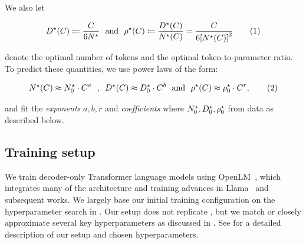 \documentclass{article}
\newcommand{\neurips}[1]{foo}
\newcommand{\workshop}[1]{baz}
\renewcommand{\neurips}[1]{\ignorespaces}%
\renewcommand{\workshop}[1]{\ignorespaces}%
\renewcommand{\neurips}[1]{\ignorespaces}%
\renewcommand{\workshop}[1]{#1}%
\renewcommand{\neurips}[1]{#1}%
\renewcommand{\workshop}[1]{\ignorespaces}%
\theoremstyle{plain}
\theoremstyle{definition}
\theoremstyle{remark}
\DeclarePairedDelimiter{\brk}{[}{]}
\newcommand\numberthis{\addtocounter{equation}{1}\tag{\theequation}}
\newcommand{\defeq}{\coloneqq}
\newcommand{\maybeSubscript}[1]{
  \ifthenelse{\equal{#1}{}}{}{_{#1}}%
}
\newcommand{\params}[1][]{N\maybeSubscript{#1}}
\newcommand{\paramsStar}[1][]{\params[#1]^{\star}}
\newcommand{\tokens}[1][]{D\maybeSubscript{#1}}
\newcommand{\tokensStar}[1][]{\tokens[#1]^{\star}}
\newcommand{\ratio}[1][]{\rho\maybeSubscript{#1}}
\newcommand{\ratioStar}[1][]{\ratio{#1}^{\star}}
\newcommand{\nExp}{a}
\newcommand{\dExp}{b}
\newcommand{\rExp}{r}
\begin{document}
We also let
\neurips{
    \[
    \tokensStar(C) \defeq \frac{C}{6\paramsStar}
    ~~\mbox{and}~~
    \ratioStar(C) \defeq 
    \frac{\tokensStar(C)}{\paramsStar(C)} 
    = \frac{C}{6\brk*{\paramsStar(C)}^2}
    \numberthis
    \label{eq:D-rho-star-def}
\]
}
\workshop{
    \begin{equation}
        \begin{aligned}
            \tokensStar(C) &\defeq \frac{C}{6\paramsStar}
        ~~\mbox{and}~~ \\
        \ratioStar(C) &\defeq 
        \frac{\tokensStar(C)}{\paramsStar(C)} 
        = \frac{C}{6\brk*{\paramsStar(C)}^2}
        \end{aligned}
        \numberthis \label{eq:D-rho-star-def}
    \end{equation}
}
denote the optimal number of tokens and the optimal token-to-parameter ratio. To predict these quantities, we use power laws of the form:
\neurips{
    \[
    \paramsStar(C) \approx  \paramsStar_0 \cdot C^\nExp 
    ~~\mbox{,}~~
    \tokensStar(C) \approx  \tokensStar_0 \cdot C^\dExp 
    ~~\mbox{and}~~
    \ratioStar(C) \approx  \ratioStar_0 \cdot C^\rExp, 
    \numberthis \label{eq:power-law-forms}
\]
}
\workshop{
    \begin{equation}
        \begin{aligned}
            &\paramsStar(C) \approx  \paramsStar_0 \cdot C^\nExp 
        ~~\mbox{,}~~
        \tokensStar(C) \approx  \tokensStar_0 \cdot C^\dExp  \\
        &~~\mbox{and}~~
        \ratioStar(C) \approx  \ratioStar_0 \cdot C^\rExp,
        \end{aligned}
        \numberthis \label{eq:power-law-forms}
    \end{equation}
}
and fit the \emph{exponents} $\nExp,\dExp,\rExp$ and \emph{coefficients} 
where $\paramsStar_0, \tokensStar_0, \ratioStar_0$ from data as described below. 

\subsection{Training setup}
We train decoder-only Transformer language models using OpenLM~\cite{gururangan2023openlm}, which integrates many of the architecture and training advances in Llama~\cite{touvron2023llama,touvron2023llama2} and subsequent works. We largely base our initial training configuration on the hyperparameter search in \citet{gadre2024language}. Our setup does not replicate \citet{kaplan2020scaling}, but we match or closely approximate several key hyperparameters as discussed in . See  for a detailed description of our setup and chosen hyperparameters. 
\end{document}
